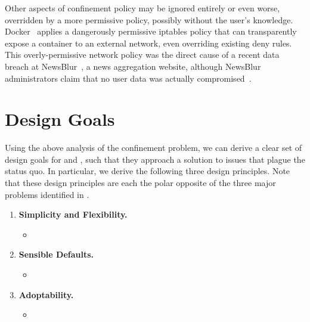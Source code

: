Other aspects of confinement policy may be ignored entirely or even worse, overridden by
a more permissive policy, possibly without the user's knowledge.
Docker~\cite{docker_security} applies a dangerously permissive iptables policy that can
transparently expose a container to an external network, even overriding existing deny
rules. This overly-permissive network policy was the direct cause of a recent data breach
at NewsBlur~\cite{newsblur}, a news aggregation website, although NewsBlur administrators
claim that no user data was actually compromised~\cite{newsblur}. 



\section{Design Goals}%
\label{s:cp-design}

Using the above analysis of the confinement problem, we can derive a clear set of design
goals for \bpfbox{} and \bpfcontain{}, such that they approach a solution to issues that
plague the status quo. In particular, we derive the following three design principles.
Note that these design principles are each the polar opposite of the three major problems
identified in .

\begin{enumerate}[font=\bfseries]
  \item \textbf{Simplicity and Flexibility.}
  \begin{inprogress}
    \begin{itemize}
      \item
    \end{itemize}
  \end{inprogress}

  \item \textbf{Sensible Defaults.}
  \begin{inprogress}
    \begin{itemize}
      \item
    \end{itemize}
  \end{inprogress}

  \item \textbf{Adoptability.}
  \begin{inprogress}
    \begin{itemize}
      \item
    \end{itemize}
  \end{inprogress}
\end{enumerate}





